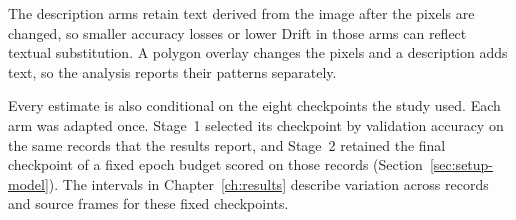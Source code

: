 The description arms retain text derived from the image after the pixels are
changed, so smaller accuracy losses or lower Drift in those arms can reflect
textual substitution. A polygon overlay changes the pixels and a description
adds text, so the analysis reports their patterns separately.

Every estimate is also conditional on the eight checkpoints the study used.
Each arm was adapted once. Stage~1 selected its checkpoint by validation
accuracy on the same records that the results report, and Stage~2 retained the
final checkpoint of a fixed epoch budget scored on those records
(Section~\ref{sec:setup-model}). The intervals in Chapter~\ref{ch:results}
describe variation across records and source frames for these fixed
checkpoints.
